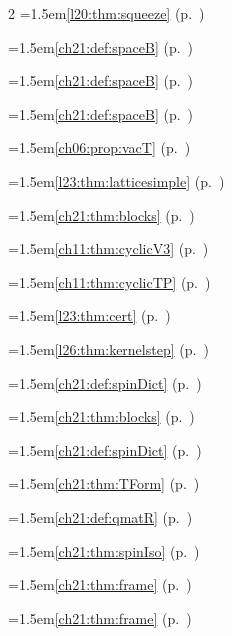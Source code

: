 \begin{multicols}{2}
\hangindent=1.5em\quad \ref{l20:thm:squeeze} (p.~\pageref{l20:thm:squeeze})\par
\hangindent=1.5em\quad \ref{ch21:def:spaceB} (p.~\pageref{ch21:def:spaceB})\par
\hangindent=1.5em\quad \ref{ch21:def:spaceB} (p.~\pageref{ch21:def:spaceB})\par
\hangindent=1.5em\quad \ref{ch21:def:spaceB} (p.~\pageref{ch21:def:spaceB})\par
\hangindent=1.5em\quad \ref{ch06:prop:vacT} (p.~\pageref{ch06:prop:vacT})\par
\hangindent=1.5em\quad \ref{l23:thm:latticesimple} (p.~\pageref{l23:thm:latticesimple})\par
\hangindent=1.5em\quad \ref{ch21:thm:blocks} (p.~\pageref{ch21:thm:blocks})\par
\hangindent=1.5em\quad \ref{ch11:thm:cyclicV3} (p.~\pageref{ch11:thm:cyclicV3})\par
\hangindent=1.5em\quad \ref{ch11:thm:cyclicTP} (p.~\pageref{ch11:thm:cyclicTP})\par
\hangindent=1.5em\quad \ref{l23:thm:cert} (p.~\pageref{l23:thm:cert})\par
\hangindent=1.5em\quad \ref{l26:thm:kernelstep} (p.~\pageref{l26:thm:kernelstep})\par
\hangindent=1.5em\quad \ref{ch21:def:spinDict} (p.~\pageref{ch21:def:spinDict})\par
\hangindent=1.5em\quad \ref{ch21:thm:blocks} (p.~\pageref{ch21:thm:blocks})\par
\hangindent=1.5em\quad \ref{ch21:def:spinDict} (p.~\pageref{ch21:def:spinDict})\par
\hangindent=1.5em\quad \ref{ch21:thm:TForm} (p.~\pageref{ch21:thm:TForm})\par
\hangindent=1.5em\quad \ref{ch21:def:qmatR} (p.~\pageref{ch21:def:qmatR})\par
\hangindent=1.5em\quad \ref{ch21:thm:spinIso} (p.~\pageref{ch21:thm:spinIso})\par
\hangindent=1.5em\quad \ref{ch21:thm:frame} (p.~\pageref{ch21:thm:frame})\par
\hangindent=1.5em\quad \ref{ch21:thm:frame} (p.~\pageref{ch21:thm:frame})\par

\end{multicols}
